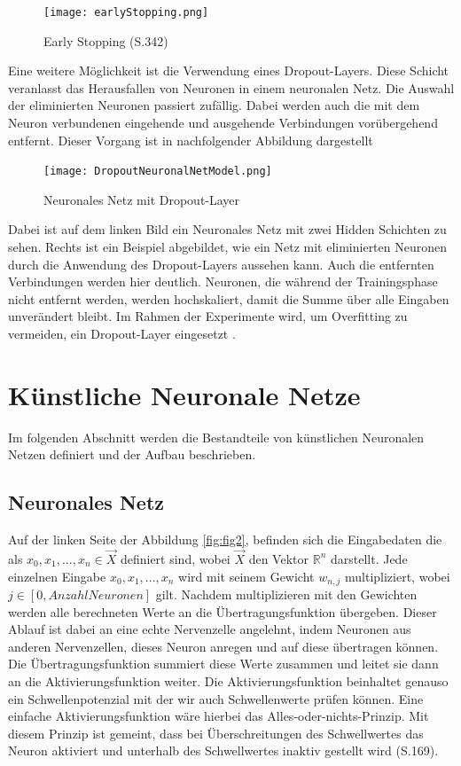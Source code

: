 \documentclass[12pt]{scrreprt}
\begin{document}
\begin{figure}[h!]
	\centering
	\texttt{[image: earlyStopping.png]}
	\caption{Early Stopping \cite{Vogl2021} (S.342)}
	\label{fig:fig23}
\end{figure}

Eine weitere Möglichkeit ist die Verwendung eines Dropout-Layers. Diese Schicht veranlasst das Herausfallen von Neuronen in einem neuronalen Netz. Die Auswahl der eliminierten Neuronen passiert zufällig. Dabei werden auch die mit dem Neuron verbundenen eingehende und ausgehende Verbindungen vorübergehend entfernt. Dieser Vorgang ist in nachfolgender Abbildung dargestellt \cite{Srivastava2014}
\newpage
\begin{figure}[h!]
	\centering
	\texttt{[image: 
		DropoutNeuronalNetModel.png]}
	\caption{Neuronales Netz mit Dropout-Layer \cite{Srivastava2014}}
	\label{fig:fig24}
\end{figure}

Dabei ist auf dem linken Bild ein Neuronales Netz mit zwei Hidden Schichten zu sehen. Rechts ist ein Beispiel abgebildet, wie ein Netz mit eliminierten Neuronen durch die Anwendung des Dropout-Layers aussehen kann. Auch die entfernten Verbindungen werden hier deutlich. Neuronen, die während der Trainingsphase nicht entfernt werden, werden hochskaliert, damit die Summe über alle Eingaben unverändert bleibt. Im Rahmen der Experimente wird, um Overfitting zu vermeiden, ein Dropout-Layer eingesetzt \cite{tensorflow2022}.

\section{Künstliche Neuronale Netze}

Im folgenden Abschnitt werden die Bestandteile von künstlichen Neuronalen Netzen definiert und der Aufbau beschrieben.

\subsection{Neuronales Netz}\label{chapter:NeuronalesNetz}
	
Auf der linken Seite der Abbildung \ref{fig:fig2}, befinden sich die Eingabedaten die als $x_{0}, x_{1}, ..., x_{n} \in{\vec{X}}$  definiert sind, wobei $\vec{X}$ den Vektor $\mathbb{R}^n$ darstellt. Jede einzelnen Eingabe $x_{0}, x_{1},...,x_{n}$ wird mit seinem Gewicht $w_{n,j}$ multipliziert, wobei $j \in{[0,Anzahl Neuronen]}$ gilt. Nachdem multiplizieren mit den Gewichten werden alle berechneten Werte an die Übertragungsfunktion übergeben. Dieser Ablauf ist dabei an eine echte Nervenzelle angelehnt, indem Neuronen aus anderen Nervenzellen, dieses Neuron anregen und auf diese übertragen können. Die Übertragungsfunktion summiert diese Werte zusammen und leitet sie dann an die Aktivierungsfunktion weiter. Die Aktivierungsfunktion beinhaltet genauso ein Schwellenpotenzial mit der wir auch Schwellenwerte prüfen können. Eine einfache Aktivierungsfunktion wäre hierbei das Alles-oder-nichts-Prinzip. Mit diesem Prinzip ist gemeint, dass bei Überschreitungen des Schwellwertes das Neuron aktiviert und unterhalb des Schwellwertes inaktiv gestellt wird \cite{Frochte2021}(S.169). \\
	
\end{document}
